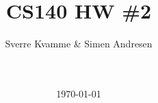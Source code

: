 \newcommand{\figurepath}{./figures/}
\newcommand{\figurescale}{0.6}
\newcommand{\codepath}{../matlab/}




\title{CS140 HW \#2}
\author{Sverre Kvamme \& Simen Andresen}
\date{\ \\ \ \\ \today}




\maketitle


\pagestyle{fancy}
\lhead{}
\rhead{\thepage}
\setcounter{page}{1}

\rhead{\thepage}
\cfoot{}


%



